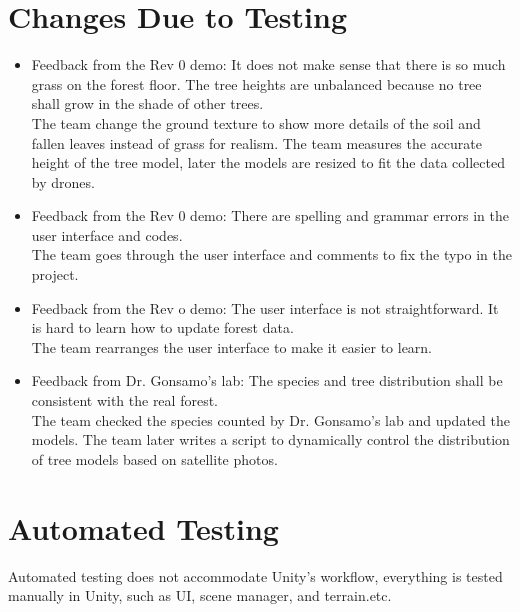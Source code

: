 \documentclass[12pt, titlepage]{article}
\begin{document}
\section{Changes Due to Testing}
\begin{itemize}
    \item Feedback from the Rev 0 demo: It does not make sense that there is so much grass on the forest floor. The tree heights are unbalanced because no tree shall grow in the shade of other trees.\\
    The team change the ground texture to show more details of the soil and fallen leaves instead of grass for realism. The team measures the accurate height of the tree model, later the models are resized to fit the data collected by drones.
    \item Feedback from the Rev 0 demo: There are spelling and grammar errors in the user interface and codes.\\
    The team goes through the user interface and comments to fix the typo in the project.
    \item Feedback from the Rev o demo: The user interface is not straightforward. It is hard to learn how to update forest data.\\
    The team rearranges the user interface to make it easier to learn.
    \item Feedback from Dr. Gonsamo's lab: The species and tree distribution shall be consistent with the real forest.\\
    The team checked the species counted by Dr. Gonsamo's lab and updated the models. The team later writes a script to dynamically control the distribution of tree models based on satellite photos.
\end{itemize}



\section{Automated Testing}
Automated testing does not accommodate Unity's workflow, everything is tested manually in Unity, such as UI, scene manager, and terrain.etc.

\newpage
\end{document}
